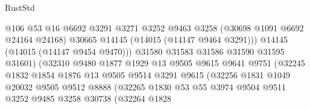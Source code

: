 \begin{lexlean}{RustStd}
\begin{coremodule}
                                      @106
                                      @53
                                      @16
                                      @6692
                                      @3291
                                      @3271
                                      @3252
                                      @9463
                                      @3258
                                      (@30698 @1091 @6692 @24164 @24168)
                                      @30665
                                      @14145
                                      (@14015 (@14147 @9464 @3291)))
                                    @14145
                                    (@14015 (@14147 @9454 @9470)))
                                  @31580
                                  @31583
                                  @31586
                                  @31590
                                  @31595
                                  @31601)
                                (@32310
                                  @9480
                                  @1877
                                  @1929
                                  @13
                                  @9505
                                  @9615
                                  @9641
                                  @9751
                                  (@32245
                                    @1832
                                    @1854
                                    @1876
                                    @13
                                    @9505
                                    @9514
                                    @3291
                                    @9615
                                    (@32256
                                      @1831
                                      @1049
                                      @20032
                                      @9505
                                      @9512
                                      @8888
                                      (@32265
                                        @1830
                                        @53
                                        @55
                                        @3974
                                        @9504
                                        @9511
                                        @3252
                                        @9485
                                        @3258
                                        @30738
                                        (@32264
                                          @1828

\end{coremodule}
\end{lexlean}
